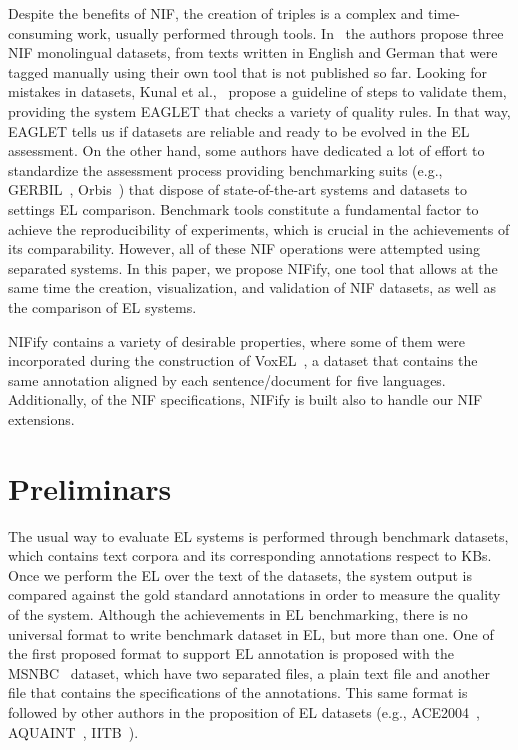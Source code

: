 \documentclass{llncs}
\begin{document}
Despite the benefits of NIF, the creation of triples is a complex and time-consuming work, usually performed through tools. In~\cite{N3} the authors propose three NIF monolingual datasets, from texts written in English and German that were tagged manually using their own tool that is not published so far. Looking for mistakes in datasets,  Kunal et al.,~\cite{Kunal2017} propose a guideline of steps to validate them, providing the system EAGLET that checks a variety of quality rules. In that way, EAGLET tells us if datasets are reliable and ready to be evolved in the EL assessment. On the other hand, some authors have dedicated a lot of effort to standardize the assessment process providing benchmarking suits (e.g., GERBIL~\cite{gerbil-2015}, Orbis~\cite{Orbis2018}) that dispose of state-of-the-art systems and datasets to settings EL comparison. Benchmark tools constitute a fundamental factor to achieve the reproducibility of experiments, which is crucial in the achievements of its comparability. However, all of these NIF operations were attempted using separated systems. In this paper, we propose NIFify, one tool that allows at the same time the creation, visualization, and validation of NIF datasets, as well as the comparison of EL systems. 

NIFify contains a variety of desirable properties, where some of them were incorporated during the construction of VoxEL~\cite{VoxEL2018}, a dataset that contains the same annotation aligned by each sentence/document for five languages. Additionally, of the NIF specifications, NIFify is built also to handle our NIF extensions. 




\section{Preliminars}
\label{sec:nif}


The usual way to evaluate EL systems is performed through benchmark datasets, which contains text corpora and its corresponding annotations respect to KBs. Once we perform the EL over the text of the datasets, the system output is compared against the gold standard annotations in order to measure the quality of the system. Although the achievements in EL benchmarking, there is no universal format to write benchmark dataset in EL, but more than one. One of the first proposed format to support EL annotation is proposed with the MSNBC~\cite{cucerzan2007large} dataset, which have two separated files, a plain text file and another file that contains the specifications of the annotations. This same format is followed by other authors in the proposition of EL datasets (e.g., ACE2004~\cite{aquaint}, AQUAINT~\cite{aquaint}, IITB~\cite{IITB2009}). 
\end{document}
